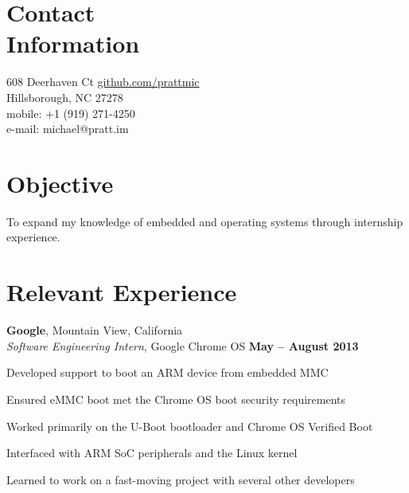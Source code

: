 \documentclass[margin,line,letterpaper]{resume}
\begin{document}
\begin{resume}

    \section{\mysidestyle Contact\\Information}

    608 Deerhaven Ct                \hfill {\Large\href{http://github.com/prattmic}{github.com/prattmic}}   \\
    Hillsborough, NC 27278          \\
    mobile: +1 (919) 271-4250       \\
    e-mail: michael@pratt.im        \vspace{0mm}\\\vspace{-4.5mm}%


    \section{\mysidestyle Objective}

    To expand my knowledge of embedded and operating systems through internship experience.



    \section{\mysidestyle Relevant Experience}

    \textbf{Google}, Mountain View, California \vspace{1mm}\\\vspace{1mm}%
    \textsl{Software Engineering Intern}, Google Chrome OS \hfill \textbf{May -- August 2013}\vspace{-3mm}\\\vspace{-1mm}%
    \begin{list2}
    \item Developed support to boot an ARM device from embedded MMC
    \item Ensured eMMC boot met the Chrome OS boot security requirements
    \item Worked primarily on the U-Boot bootloader and Chrome OS Verified Boot
    \item Interfaced with ARM SoC peripherals and the Linux kernel
    \item Learned to work on a fast-moving project with several other developers
    \end{list2}\vspace{-1.5mm}


\end{resume}
\end{document}
